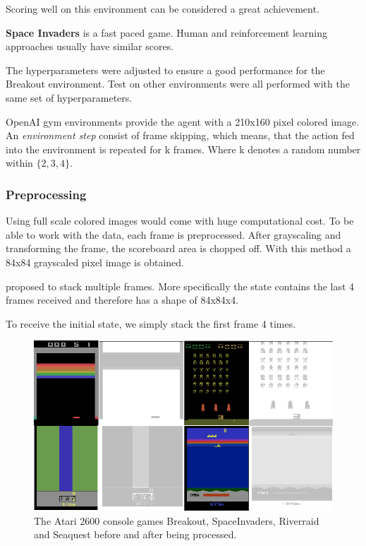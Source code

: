 Scoring well on this environment can be considered a great achievement.

\textbf{Space Invaders} is a fast paced game. Human and reinforcement learning approaches usually have similar scores. \citep{mnih2015atari}

The hyperparameters were adjusted to ensure a good performance for the Breakout environment. Test on other environments were all performed with the same set of hyperparameters.


OpenAI gym environments provide the agent with a 210x160 pixel colored image. An \textit{environment step} consist of frame skipping, which means, that the action fed into the environment is repeated for k frames. Where k denotes a random number within $\{2,3,4\}$.
\subsubsection{Preprocessing}
Using full scale colored images would come with huge computational cost. To be able to work with the data, each frame is preprocessed.
After grayscaling and transforming the frame, the scoreboard area is chopped off. With this method a 84x84 grayscaled pixel image is obtained. 

\citet{nature} proposed to stack multiple frames. More specifically the state contains the last 4 frames received and therefore has a shape of 84x84x4.

To receive the initial state, we simply stack the first frame 4 times.

\begin{figure}
\includegraphics[scale=0.5]{bilder/atarienv.png}
\caption{The Atari 2600 console games Breakout, SpaceInvaders, Riverraid and Seaquest before and after being processed.}
\end{figure}

